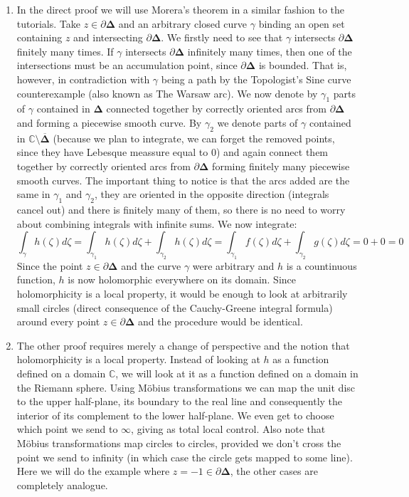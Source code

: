 \documentclass[a4paper, 12pt]{article} %
\newcommand{\C}{\mathbb{C}}
\newcommand{\closure}[1]{\overline{#1}}
\begin{document}
\begin{enumerate}
\item
In the direct proof we will use Morera's theorem in a similar fashion to the tutorials. Take $z \in \partial\mathbf{\Delta}$ and an arbitrary closed curve $\gamma$ binding an open set containing $z$ and intersecting $\partial\mathbf{\Delta}$. We firstly need to see that $\gamma$ intersects $\partial\mathbf{\Delta}$ finitely many times. If $\gamma$ intersects $\partial\mathbf{\Delta}$ infinitely many times, then one of the intersections must be an accumulation point, since $\partial\mathbf{\Delta}$ is bounded. That is, however, in contradiction with $\gamma$ being a path by the Topologist's Sine curve counterexample (also known as The Warsaw arc). We now denote by $\gamma_1$ parts of $\gamma$ contained in $\mathbf{\Delta}$ connected together by correctly oriented arcs from $\partial\mathbf{\Delta}$ and forming a piecewise smooth curve. By $\gamma_2$ we denote parts of $\gamma$ contained in $\C\setminus\closure{\mathbf{\Delta}}$ (because we plan to integrate, we can forget the removed points, since they have Lebesque meassure equal to $0$) and again connect them together by correctly oriented arcs from $\partial\mathbf{\Delta}$ forming finitely many piecewise smooth curves. The important thing to notice is that the arcs added are the same in $\gamma_1$ and $\gamma_2$, they are oriented in the opposite direction (integrals cancel out) and there is finitely many of them, so there is no need to worry about combining integrals with infinite sums.
We now integrate:
\[
\int_\gamma h(\zeta) d\zeta = \int_{\gamma_1} h(\zeta) d\zeta + \int_{\gamma_2} h(\zeta) d\zeta = \int_{\gamma_1} f(\zeta) d\zeta + \int_{\gamma_2} g(\zeta) d\zeta = 0 + 0  = 0
\]
Since the point $z \in \partial\mathbf{\Delta}$ and the curve $\gamma$ were arbitrary and $h$ is a countinuous function, $h$ is now holomorphic everywhere on its domain. Since holomorphicity is a local property, it would be enough to look at arbitrarily small circles (direct consequence of the Cauchy-Greene integral formula) around every point $z \in \partial\mathbf{\Delta}$ and the procedure would be identical.
\item
The other proof requires merely a change of perspective and the notion that holomorphicity is a local property. Instead of looking at $h$ as a function defined on a domain $\C$, we will look at it as a function defined on a domain in the Riemann sphere. Using M\"obius transformations we can map the unit disc to the upper half-plane, its boundary to the real line and consequently the interior of its complement to the lower half-plane. We even get to choose which point we send to $\infty$, giving as total local control. Also note that M\"obius transformations map circles to circles, provided we don't cross the point we send to infinity (in which case the circle gets mapped to some line). Here we will do the example where $z = -1 \in \partial\mathbf{\Delta}$, the other cases are completely analogue.


\end{enumerate}
\end{document}
